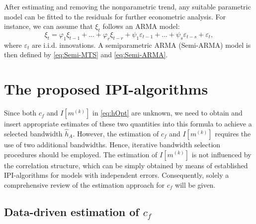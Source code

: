 After estimating and removing the nonparametric trend, any suitable parametric model can be fitted to the residuals for further econometric analysis. 
For instance, we can assume that $\xi_t$ follows an ARMA model:
\begin{equation}\label{eq:Semi-ARMA} 
\xi_t= \varphi_1\xi_{t-1} + ... + \varphi_r\xi_{t-r}+ \psi_1\varepsilon_{t-1} + ... + \psi_s\varepsilon_{t-s}+\varepsilon_t, 
\end{equation}
where $\varepsilon_t$ are i.i.d. innovations. A semiparametric ARMA (Semi-ARMA) model is then defined by \eqref{eq:Semi-MTS} and \eqref{eq:Semi-ARMA}. 

\section{The proposed IPI-algorithms} \label{sec:ipi}

Since both $c_{f}$ and $I\left[m^{\left(k\right)}\right]$ in \eqref{eq:hOpt} are unknown, we need to obtain and insert appropriate estimates of these two quantities into this formula to achieve a selected bandwidth $\hat h_{A}$. However, the estimation of $c_{f}$ and $I\left[m^{\left(k\right)}\right]$ requires the use of two additional bandwidths. Hence, iterative bandwidth selection procedures should be employed. The estimation of $I\left[m^{\left(k\right)}\right]$ is not influenced by the correlation structure, which can be simply obtained by means of established IPI-algorithms for models with independent errors. Consequently, solely a comprehensive review of the estimation approach for $c_{f}$ will be given.

\subsection{Data-driven estimation of $c_f$} \label{sec:cfEst}

